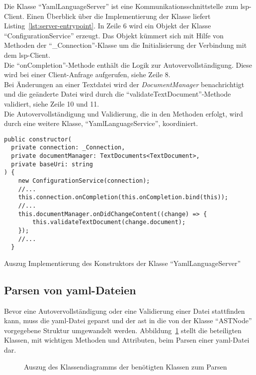 Die Klasse ``YamlLanguageServer'' ist eine Kommunikationsschnittstelle zum \ac{lsp}-Client.
Einen Überblick über die Implementierung der Klasse liefert Listing~\ref{lst:server-entrypoint}.
In Zeile 6 wird ein Objekt der Klasse ``ConfigurationService'' erzeugt. Das Objekt kümmert sich
mit Hilfe von Methoden der ``\_Connection''-Klasse um die Initialisierung der Verbindung mit dem \ac{lsp}-Client.
\\
Die ``onCompletion''-Methode enthält die Logik zur Autovervollständigung. Diese wird bei einer Client-Anfrage
aufgerufen, siehe Zeile 8.
\\
Bei Änderungen an einer Textdatei wird der \textit{DocumentManager} benachrichtigt und die geänderte Datei
wird durch die ``validateTextDocument''-Methode validiert, siehe Zeile 10 und 11.
\\
Die Autovervollständigung und Validierung, die in den Methoden erfolgt, wird durch eine weitere Klasse, ``YamlLanguageService'', koordiniert.

\begin{listing}[htp]
  \begin{verbatim}
public constructor(
  private connection: _Connection,
  private documentManager: TextDocuments<TextDocument>,
  private baseUri: string
) {
    new ConfigurationService(connection);
    //...
    this.connection.onCompletion(this.onCompletion.bind(this));
    //...
    this.documentManager.onDidChangeContent((change) => {
        this.validateTextDocument(change.document);
    });
    //...
  }
      \end{verbatim}
  \caption{Auszug Implementierung des Konstruktors der Klasse ``YamlLanguageServer''}
  \label{lst:server-entrypoint}
\end{listing}

\subsection{Parsen von \acs{yaml}-Dateien}

Bevor eine Autovervollständigung oder eine Validierung einer Datei stattfinden kann, muss die \ac{yaml}-Datei geparst und
der \ac{ast} in die von der Klasse ``ASTNode'' vorgegebene Struktur umgewandelt werden.
Abbildung~\ref{fig:class-diagram-yaml-language-service-parser} stellt die beteiligten Klassen, mit wichtigen Methoden und Attributen,
beim Parsen einer \ac{yaml}-Datei dar.

\begin{figure}[htp] %
  \centering
  \caption{Auszug des Klassendiagramms der benötigten Klassen zum Parsen}
  \label{fig:class-diagram-yaml-language-service-parser}
\end{figure}

